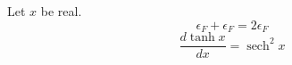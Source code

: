 \documentclass{article}
\newcommand{\ef}{\epsilon_F}
\providecommand{\ef}{2\epsilon_F}
\DeclareMathOperator{\sech}{sech}
\begin{document}
Let $x$ be real.
\begin{equation}
\ef + \ef = 2\epsilon_F
\label{eq:p1}
\end{equation}
\begin{equation}
\frac{d\tanh x}{dx} = \sech^2 x
\label{eq:p2}
\end{equation}
\end{document}
